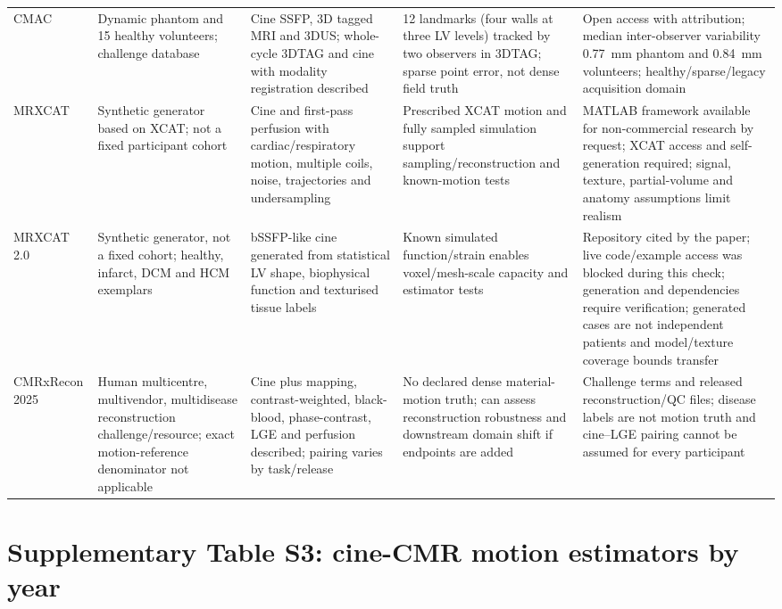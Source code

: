 \documentclass[11pt,a4paper]{article}
\begin{document}
{\begin{longtable}{L{0.11\textwidth}L{0.14\textwidth}L{0.15\textwidth}L{0.17\textwidth}L{0.23\textwidth}}
\addlinespace
CMAC~\cite{tobongomez2013cmac,cmac2011} & Dynamic phantom and 15 healthy volunteers; challenge database & Cine SSFP, 3D tagged MRI and 3DUS; whole-cycle 3DTAG and cine with modality registration described & 12 landmarks (four walls at three LV levels) tracked by two observers in 3DTAG; sparse point error, not dense field truth & Open access with attribution; median inter-observer variability 0.77~mm phantom and 0.84~mm volunteers; healthy/sparse/legacy acquisition domain \\
\addlinespace
MRXCAT~\cite{wissmann2014mrxcat} & Synthetic generator based on XCAT; not a fixed participant cohort & Cine and first-pass perfusion with cardiac/respiratory motion, multiple coils, noise, trajectories and undersampling & Prescribed XCAT motion and fully sampled simulation support sampling/reconstruction and known-motion tests & MATLAB framework available for non-commercial research by request; XCAT access and self-generation required; signal, texture, partial-volume and anatomy assumptions limit realism \\
\addlinespace
MRXCAT 2.0~\cite{mrxcat2023,mrxcat2repo} & Synthetic generator, not a fixed cohort; healthy, infarct, DCM and HCM exemplars & bSSFP-like cine generated from statistical LV shape, biophysical function and texturised tissue labels & Known simulated function/strain enables voxel/mesh-scale capacity and estimator tests & Repository cited by the paper; live code/example access was blocked during this check; generation and dependencies require verification; generated cases are not independent patients and model/texture coverage bounds transfer \\
\addlinespace
CMRxRecon 2025~\cite{cmrxrecon2025official} & Human multicentre, multivendor, multidisease reconstruction challenge/resource; exact motion-reference denominator not applicable & Cine plus mapping, contrast-weighted, black-blood, phase-contrast, LGE and perfusion described; pairing varies by task/release & No declared dense material-motion truth; can assess reconstruction robustness and downstream domain shift if endpoints are added & Challenge terms and released reconstruction/QC files; disease labels are not motion truth and cine--LGE pairing cannot be assumed for every participant \\
\bottomrule
\end{longtable}
}

\section*{Supplementary Table S3: cine-CMR motion estimators by year}
\end{document}
